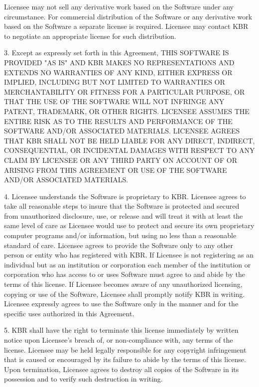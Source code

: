 Licensee may not sell any derivative work based on the Software under any circumstance. For commercial distribution of the Software or any derivative work based on the Software a separate license is required. Licensee may contact KBR to negotiate an appropriate license for such distribution.

3. Except as expressly set forth in this Agreement, THIS SOFTWARE IS PROVIDED "AS IS" AND KBR MAKES NO REPRESENTATIONS AND EXTENDS NO WARRANTIES OF ANY KIND, EITHER EXPRESS OR IMPLIED, INCLUDING BUT NOT LIMITED TO WARRANTIES OR MERCHANTABILITY OR FITNESS FOR A PARTICULAR PURPOSE, OR THAT THE USE OF THE SOFTWARE WILL NOT INFRINGE ANY PATENT, TRADEMARK, OR OTHER RIGHTS. LICENSEE ASSUMES THE ENTIRE RISK AS TO THE RESULTS AND PERFORMANCE OF THE SOFTWARE AND/OR ASSOCIATED MATERIALS. LICENSEE AGREES THAT KBR SHALL NOT BE HELD LIABLE FOR ANY DIRECT, INDIRECT, CONSEQUENTIAL, OR INCIDENTAL DAMAGES WITH RESPECT TO ANY CLAIM BY LICENSEE OR ANY THIRD PARTY ON ACCOUNT OF OR ARISING FROM THIS AGREEMENT OR USE OF THE SOFTWARE AND/OR ASSOCIATED MATERIALS.

4. Licensee understands the Software is proprietary to KBR. Licensee agrees to take all reasonable steps to insure that the Software is protected and secured from unauthorized disclosure, use, or release and will treat it with at least the same level of care as Licensee would use to protect and secure its own proprietary computer programs and/or information, but using no less than a reasonable standard of care.  Licensee agrees to provide the Software only to any other person or entity who has registered with KBR. If Licensee is not registering as an individual but as an institution or corporation each member of the institution or corporation who has access to or uses Software must agree to and abide by the terms of this license. If Licensee becomes aware of any unauthorized licensing, copying or use of the Software, Licensee shall promptly notify KBR in writing. Licensee expressly agrees to use the Software only in the manner and for the specific uses authorized in this Agreement.

5. KBR shall have the right to terminate this license immediately by written notice upon Licensee's breach of, or non-compliance with, any terms of the license. Licensee may be held legally responsible for any copyright infringement that is caused or encouraged by its failure to abide by the terms of this license. Upon termination, Licensee agrees to destroy all copies of the Software in its possession and to verify such destruction in writing.

